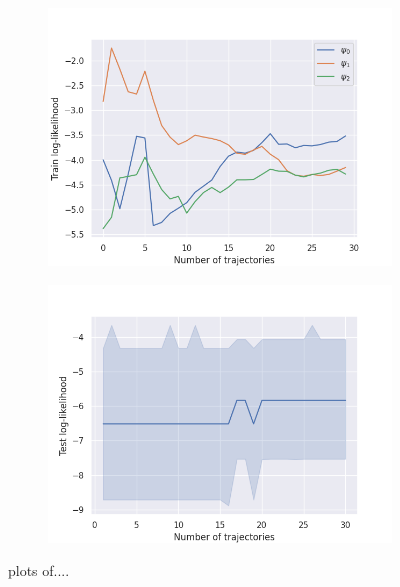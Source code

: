 \begin{figure}[htb]
	\begin{subfigure}{.5\textwidth}
		\centering
		\includegraphics[width=1\linewidth]{figures/llh_particleFilter_van}
		\caption{}
		\label{fig:sfig1}
	\end{subfigure}%
	\begin{subfigure}{.5\textwidth}
		\centering
		\includegraphics[width=1\linewidth]{figures/test_likelihood_particleFilter_van}
		\caption{}
		\label{fig:sfig2}
	\end{subfigure}
	\caption{plots of....}
	\label{fig:fig}
\end{figure}

